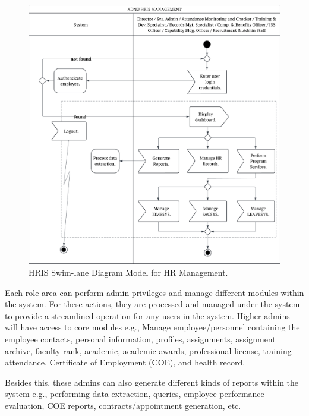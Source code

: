    \begin{figure}[H]
        \centering
        \includegraphics[width=1\linewidth]{figures/images/diagrams/swimlane/swimlane-admins.png}
        \caption{HRIS Swim-lane Diagram Model for HR Management.}
        \label{fig:swimlane-admins}
    \end{figure}

    Each role area can perform admin privileges and manage different modules within the system. For these actions, they are processed and managed under the system to provide a streamlined operation for any users in the system. Higher admins will have access to core modules e.g., Manage employee/personnel containing the employee contacts, personal information, profiles, assignments, assignment archive, faculty rank, academic, academic awards, professional license, training attendance, Certificate of Employment (COE), and health record.

    Besides this, these admins can also generate different kinds of reports within the system e.g., performing data extraction, queries, employee performance evaluation, COE reports, contracts/appointment generation, etc.

